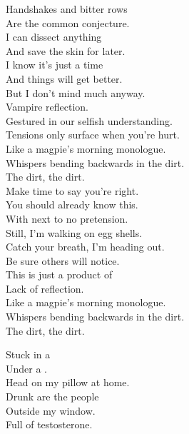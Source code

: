 


Handshakes and bitter rows \\
Are the common conjecture. \\
I can dissect anything \\
And save the skin for later. \\

I know it's just a time \\
And things will get better. \\
But I don't mind much anyway. \\
Vampire reflection. \\

Gestured in our selfish understanding. \\
Tensions only surface when you're hurt. \\
Like a magpie's morning monologue. \\
Whispers bending backwards in the dirt. \\
The dirt, the dirt. \\

Make time to say you're right. \\
You should already know this. \\
With next to no pretension. \\
Still, I'm walking on egg shells. \\

Catch your breath, I'm heading out. \\
Be sure others will notice. \\
This is just a product of \\
Lack of reflection. \\

Like a magpie's morning monologue. \\
Whispers bending backwards in the dirt. \\
The dirt, the dirt. \\




Stuck in a  \\
Under a . \\
Head on my pillow at home. \\
Drunk are the people \\
Outside my window. \\
Full of testosterone. \\

